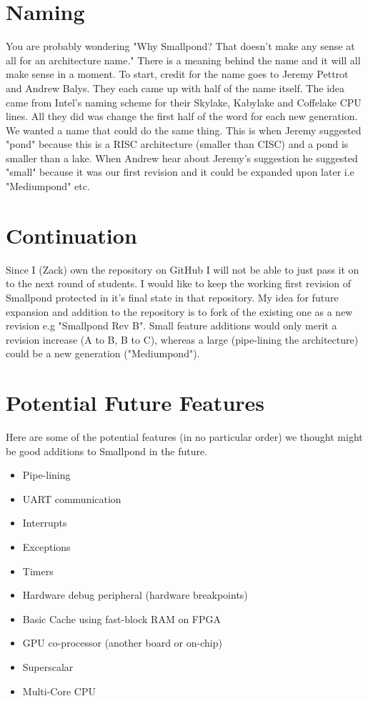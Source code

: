 \documentclass[12pt]{article}
\begin{document}
\section{Naming}
You are probably wondering "Why Smallpond? That doesn't make any sense at all for an architecture name." There is a meaning behind the name and it will all make sense in a moment. To start, credit for the name goes to Jeremy Pettrot and Andrew Balys. They each came up with half of the name itself. The idea came from Intel's naming scheme for their Skylake, Kabylake and Coffelake CPU lines. All they did was change the first half of the word for each new generation. We wanted a name that could do the same thing. This is when Jeremy suggested "pond" because this is a RISC architecture (smaller than CISC) and a pond is smaller than a lake. When Andrew hear about Jeremy's suggestion he suggested "small" because it was our first revision and it could be expanded upon later i.e "Mediumpond" etc.
\newpage

\section{Continuation}
Since I (Zack) own the repository on GitHub I will not be able to just pass it on to the next round of students. I would like to keep the working first revision of Smallpond protected in it's final state in that repository. My idea for future expansion and addition to the repository is to fork of the existing one as a new revision e.g "Smallpond Rev B". Small feature additions would only merit a revision increase (A to B, B to C), whereas a large (pipe-lining the architecture) could be a new generation ("Mediumpond").

    \section{Potential Future Features}
    Here are some of the potential features (in no particular order) we thought might be good additions to Smallpond in the future.\\
    \begin{itemize}
        \item Pipe-lining
        \item UART communication
        \item Interrupts
        \item Exceptions
        \item Timers
        \item Hardware debug peripheral (hardware breakpoints)
        \item Basic Cache using fast-block RAM on FPGA
        \item GPU co-processor (another board or on-chip)
        \item Superscalar
        \item Multi-Core CPU
    \end{itemize}
    
\end{document}
